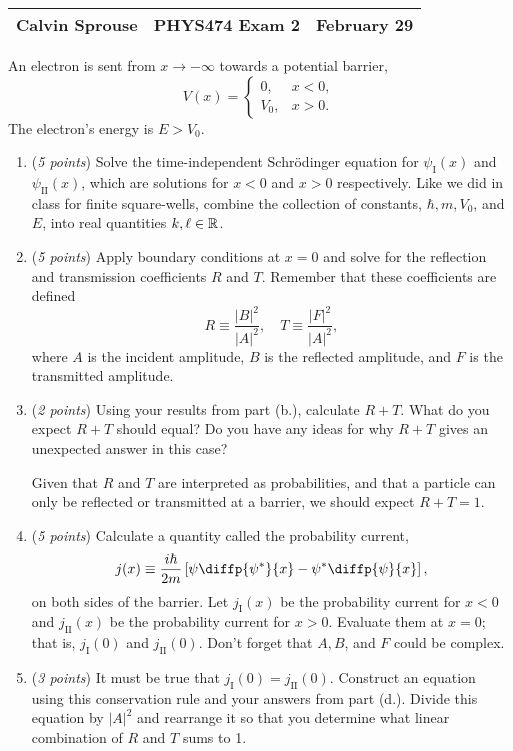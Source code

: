 \documentclass[a4paper, 12pt]{config/homework}
\begin{document}
\noindent
\begin{tabularx}{\textwidth}{>{\centering\arraybackslash}X>{\centering\arraybackslash}X>{\centering\arraybackslash}X}
Calvin Sprouse & PHYS474 Exam 2 & 2024 February 29\\
\midrule
\end{tabularx}

\vspace{\baselineskip}\noindent
An electron is sent from \(x\to-\infty \) towards a potential barrier,
\[V(x) = \begin{cases}
0, & x < 0, \\ V_0, & x > 0.
\end{cases}\]
The electron's energy is \(E>V_0\).
\begin{enumerate}[label=(\alph*.)]
\item (\textit{5 points}) Solve the time-independent Schr{\"o}dinger equation for \(\psi_\text{I}(x)\) and \(\psi_\text{II}(x)\), which are solutions for \(x<0\) and \(x>0\) respectively. Like we did in class for finite square-wells, combine the collection of constants, \(\hbar,m,V_0\), and \(E\), into real quantities \(k,\ell\in\mathbb{R} \).



\item (\textit{5 points}) Apply boundary conditions at \(x=0\) and solve for the reflection and transmission coefficients \(R\) and \(T\). Remember that these coefficients are defined
\[R \equiv \frac{|B|^2}{|A|^2}, \quad T\equiv\frac{|F|^2}{|A|^2},\]
where \(A\) is the incident amplitude, \(B\) is the reflected amplitude, and \(F\) is the transmitted amplitude.



\item (\textit{2 points}) Using your results from part (b.), calculate \(R+T\). What do you expect \(R+T\) should equal? Do you have any ideas for why \(R+T\) gives an unexpected answer in this case?

Given that \(R\) and \(T\) are interpreted as probabilities, and that a particle can only be reflected or transmitted at a barrier, we should expect
\(R + T = 1. \)

\item (\textit{5 points}) Calculate a quantity called the probability current,
\[j(x) \equiv \frac{i\hbar}{2m}\left[\psi\diffp{\psi^*}{x} - \psi^*\diffp{\psi}{x}\right],\]
on both sides of the barrier. Let \(j_\text{I}(x)\) be the probability current for \(x<0\) and \(j_\text{II}(x)\) be the probability current for \(x>0\). Evaluate them at \(x=0\); that is, \(j_\text{I}(0)\) and \(j_\text{II}(0)\). Don't forget that \(A,B\), and \(F\) could be complex.



\item (\textit{3 points}) It must be true that \(j_\text{I}(0)=j_\text{II}(0)\). Construct an equation using this conservation rule and your answers from part (d.). Divide this equation by \(|A|^2\) and rearrange it so that you determine what linear combination of \(R\) and \(T\) sums to 1.



\end{enumerate}
\end{document}
